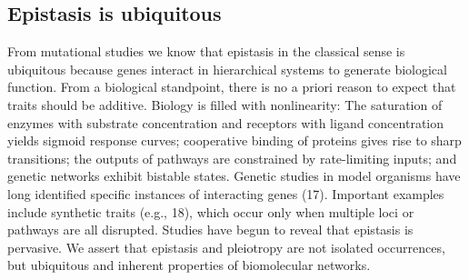 \subsection{Epistasis is ubiquitous}
From mutational studies we know that epistasis in the classical sense is ubiquitous because genes interact in hierarchical systems to generate biological function.  \cite{phillips2008epistasis}
From a biological standpoint, there is no a priori reason to expect that traits should be additive. Biology is filled with nonlinearity: The saturation of enzymes with substrate concentration and receptors with ligand concentration yields sigmoid response curves; cooperative binding of proteins gives rise to sharp transitions; the outputs of pathways are constrained by rate-limiting inputs; and genetic networks exhibit bistable states. \cite{zuk2012mystery}
Genetic studies in model organisms have long identified specific instances of interacting genes (17). Important examples include synthetic traits (e.g., 18), which occur only when multiple loci or pathways are all disrupted. \cite{zuk2012mystery}
Studies have begun to reveal that epistasis is pervasive.  \cite{zuk2012mystery}
We assert that epistasis and pleiotropy are not isolated occurrences, but ubiquitous and inherent properties of biomolecular networks. \cite{tyler2009shadows}


